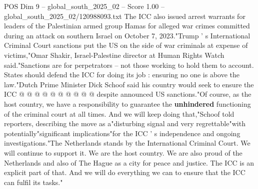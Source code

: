 \begin{textsample}{POS Dim 9 – global\_south\_2025\_02 – Score 1.00 – global\_south\_2025\_02/120988093.txt}
The ICC also issued arrest warrants for leaders of the Palestinian armed group Hamas for alleged war crimes committed during an attack on southern Israel on October 7, 2023."Trump ' s International Criminal Court sanctions put the US on the side of war criminals at expense of victims,"Omar Shakir, Israel-Palestine director at Human Rights Watch said."Sanctions are for perpetrators -- not those working to hold them to account.
States should defend the ICC for doing its job : ensuring no one is above the law."Dutch Prime Minister Dick Schoof said his country would seek to ensure the ICC @ @ @ @ @ @ @ @ @ @ despite announced US sanctions."Of course, as the host country, we have a responsibility to guarantee the \textbf{unhindered} functioning of the criminal court at all times.
And we will keep doing that,"Schoof told reporters, describing the move as a"disturbing signal and very regrettable"with potentially"significant implications"for the ICC ' s independence and ongoing investigations."The Netherlands stands by the International Criminal Court.
We will continue to support it.
We are the host country.
We are also proud of the Netherlands and also of The Hague as a city for peace and justice.
The ICC is an explicit part of that.
And we will do everything we can to ensure that the ICC can fulfil its tasks."

\end{textsample}
